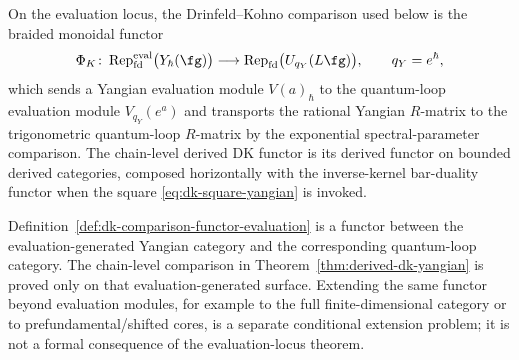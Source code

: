 \begin{definition}
\label{def:dk-comparison-functor-evaluation}
On the evaluation locus, the Drinfeld--Kohno comparison used below is
the braided monoidal functor
\[
\Phi_K\colon
\operatorname{Rep}^{\mathrm{eval}}_{\mathrm{fd}}
\bigl(Y_\hbar(\fg)\bigr)
\longrightarrow
\operatorname{Rep}_{\mathrm{fd}}
\bigl(U_{q_Y}(L\fg)\bigr),
\qquad q_Y=e^\hbar,
\]
which sends a Yangian evaluation module $V(a)_\hbar$ to the
quantum-loop evaluation module $V_{q_Y}(e^a)$ and transports the
rational Yangian $R$-matrix to the trigonometric quantum-loop
$R$-matrix by the exponential spectral-parameter comparison.  The
chain-level derived DK functor is its derived functor on bounded
derived categories, composed horizontally with the inverse-kernel
bar-duality functor when the square
\eqref{eq:dk-square-yangian} is invoked.
\end{definition}

\begin{remark}
\label{rem:dk-functor-evaluation-scope}
\ClaimStatusConditional{}
Definition~\ref{def:dk-comparison-functor-evaluation} is a functor
between the evaluation-generated Yangian category and the corresponding
quantum-loop category.  The chain-level comparison in
Theorem~\ref{thm:derived-dk-yangian} is proved only on that
evaluation-generated surface.  Extending the same functor beyond
evaluation modules, for example to the full finite-dimensional category
or to prefundamental/shifted cores, is a separate conditional
extension problem; it is not a formal consequence of the
evaluation-locus theorem.
\end{remark}

